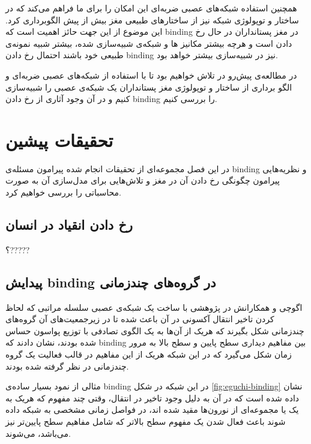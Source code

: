 \documentclass[12pt]{report}
\begin{document}
	همچنین استفاده شبکه‌های عصبی ضربه‌ای این امکان را برای ما فراهم می‌کند که در ساختار و توپولوژی شبکه نیز از ساختار‌های طبیعی مغز بیش از پیش الگوبرداری کرد. این موضوع از این جهت  حائز اهمیت است که \gls{binding} در مغز پستانداران در حال رخ دادن است و هرچه بیشتر مکانیز ها و شبکه‌ی شبیه‌سازی شده، بیشتر شبیه نمونه‌ی طبیعی خود باشند احتمال رخ دادن \gls{binding} نیز در شبیه‌سازی بیشتر خواهد بود.
	
	در مطالعه‌ی پیش‌رو در تلاش خواهیم بود تا با استفاده از شبکه‌های عصبی ضربه‌ای و الگو برداری از ساختار و توپولوژی مغز پستانداران یک شبکه‌ی عصبی را شبیه‌سازی کنیم و در آن وجود آثاری از رخ دادن \gls{binding} را بررسی کنیم.
	
	
	\chapter{تحقیقات پیشین}
	
	در این فصل مجموعه‌ای از تحقیقات انجام شده پیرامون مسئله‌ی \gls{binding} و نظریه‌هایی پیرامون چگونگی رخ دادن آن در مغز و تلاش‌هایی برای مدل‌سازی آن به صورت محاسباتی را بررسی خواهیم کرد.
	
	\section{رخ دادن انقیاد در انسان}
	؟?????
	
	\section{پیدایش \gls{binding} در گروه‌های چندزمانی}
	اگوچی و همکارانش در پژوهشی
	\cite{EGUCHI2018a}
	با ساخت یک شبکه‌ی عصبی سلسله مراتبی که لحاظ کردن تاخیر انتقال آکسونی در آن باعث شده تا در زیرجمعیت‌های آن گروه‌های چندزمانی\cite{Izhikevich2006-dy} شکل بگیرند که هریک از آن‌ها به یک الگوی تصادفی با توزیع پواسون حساس شده بودند، نشان دادند که \gls{binding} بین مفاهیم دیداری سطح پایین و سطح بالا به مرور زمان شکل می‌گیرد که در این شبکه هریک از این مفاهیم در قالب فعالیت یک گروه چندزمانی در نظر گرفته شده بودند.
	
	مثالی از نمود بسیار ساده‌ی \gls{binding} در این شبکه در شکل \ref{fig:eguchi-binding} نشان داده شده است که در آن به دلیل وجود تاخیر در انتقال، وقتی چند مفهوم که هریک به یک یا مجموعه‌ای از نورون‌ها مقید شده اند، در فواصل زمانی مشخصی به شبکه داده شوند باعث فعال شدن یک مفهوم سطح بالاتر که شامل مفاهیم سطح پایین‌تر نیز می‌باشد، می‌شوند. 
	
\end{document}
